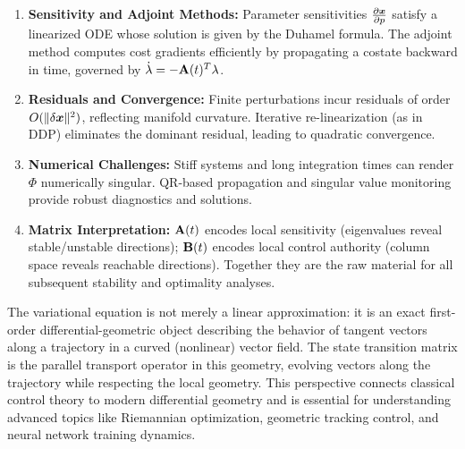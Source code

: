 \begin{enumerate}
\item \textbf{Sensitivity and Adjoint Methods:}
      Parameter sensitivities $\frac{\partial\bm{x}}{\partial p}$ satisfy a linearized ODE whose solution is given
      by the Duhamel formula. The adjoint method computes cost gradients efficiently by propagating a costate
      backward in time, governed by $\dot\lambda = -\mathbf{A}(t)^T\lambda$.

\item \textbf{Residuals and Convergence:}
      Finite perturbations incur residuals of order $O(\|\delta\bm{x}\|^2)$, reflecting manifold curvature. Iterative
      re-linearization (as in DDP) eliminates the dominant residual, leading to quadratic convergence.

\item \textbf{Numerical Challenges:}
      Stiff systems and long integration times can render $\Phi$ numerically singular. QR-based propagation
      and singular value monitoring provide robust diagnostics and solutions.

\item \textbf{Matrix Interpretation:}
      $\mathbf{A}(t)$ encodes local sensitivity (eigenvalues reveal stable/unstable directions);
      $\mathbf{B}(t)$ encodes local control authority (column space reveals reachable directions).
      Together they are the raw material for all subsequent stability and optimality analyses.

\end{enumerate}

\begin{designbox}
The variational equation is not merely a linear approximation: it is an exact first-order differential-geometric
object describing the behavior of tangent vectors along a trajectory in a curved (nonlinear) vector field.
The state transition matrix is the parallel transport operator in this geometry, evolving vectors along the
trajectory while respecting the local geometry. This perspective connects classical control theory to modern
differential geometry and is essential for understanding advanced topics like Riemannian optimization,
geometric tracking control, and neural network training dynamics.
\end{designbox}
